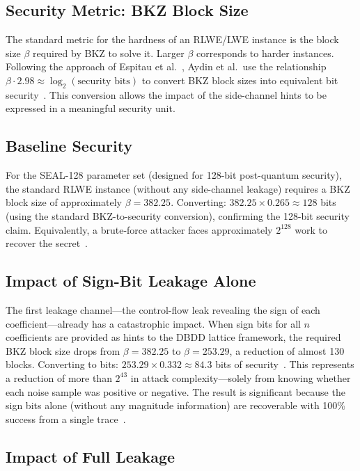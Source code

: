 \documentclass[sigconf,nonacm]{acmart}
\begin{document}
\subsection{Security Metric: BKZ Block Size}

The standard metric for the hardness of an RLWE/LWE instance is the block size
$\beta$ required by BKZ to solve it. Larger $\beta$ corresponds to harder instances.
Following the approach of Espitau et al.~\cite{espitau2020}, Aydin et al.\ use the
relationship $\beta \cdot 2.98 \approx \log_2(\text{security bits})$ to convert BKZ
block sizes into equivalent bit
security~\cite{aydin2022reveal}. This conversion allows the impact of the side-channel
hints to be expressed in a meaningful security unit.

\subsection{Baseline Security}

For the SEAL-128 parameter set (designed for 128-bit post-quantum security), the
standard RLWE instance (without any side-channel leakage) requires a BKZ block size
of approximately $\beta = 382.25$. Converting: $382.25 \times 0.265 \approx 128$
bits (using the standard BKZ-to-security conversion), confirming the 128-bit
security claim. Equivalently, a brute-force attacker faces approximately $2^{128}$
work to recover the secret~\cite{aydin2022reveal}.

\subsection{Impact of Sign-Bit Leakage Alone}

The first leakage channel---the control-flow leak revealing the sign of each
coefficient---already has a catastrophic impact. When sign bits for all $n$
coefficients are provided as hints to the DBDD lattice framework, the required BKZ
block size drops from $\beta = 382.25$ to $\beta = 253.29$, a reduction of almost
130 blocks. Converting to bits: $253.29 \times 0.332 \approx 84.3$ bits of
security~\cite{aydin2022reveal}. This represents a reduction of more than $2^{43}$
in attack complexity---solely from knowing whether each noise sample was positive
or negative. The result is significant because the sign bits alone (without any
magnitude information) are recoverable with 100\% success from a single
trace~\cite{aydin2022reveal}.

\subsection{Impact of Full Leakage}
\end{document}
